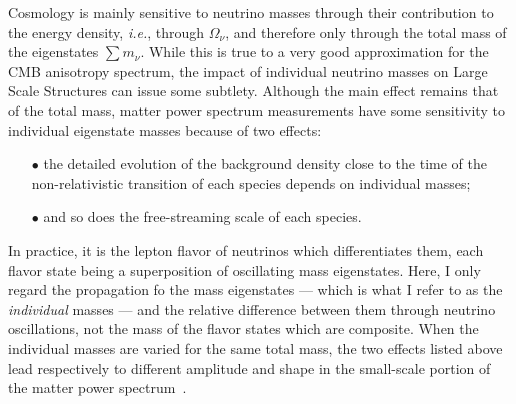 Cosmology is mainly sensitive to neutrino masses through their contribution to the energy density, \textit{i.e.}, through $\Omega_\nu$, and therefore only through the total mass of the eigenstates $\sum m_\nu$. While this is true to a very good approximation for the CMB anisotropy spectrum, the impact of individual neutrino masses on Large Scale Structures can issue some subtlety. Although  the main effect remains that of the total mass, matter power spectrum measurements have some  sensitivity to individual eigenstate masses because of two effects:  \\
\begin{itemize}
\item[$\bullet$] the detailed evolution of the background density close to the time of the non-relativistic transition of each species depends on individual masses; \\
\item[$\bullet$] and so does the free-streaming scale of each species.\\
\end{itemize}
In practice, it is the lepton flavor of neutrinos which differentiates them, each flavor state being a superposition of oscillating mass eigenstates. Here, I only regard the propagation fo the mass eigenstates --- which is what I refer to as the \emph{individual} masses --- and the relative difference between them through neutrino oscillations, not the mass of the flavor states which are composite. When the individual masses are varied for the same total mass, the two effects listed above lead respectively to different amplitude and shape in the small-scale portion of the matter power spectrum~\citep{Lesgourgues2006nd, Lesgourgues2013neutrino}. \\


